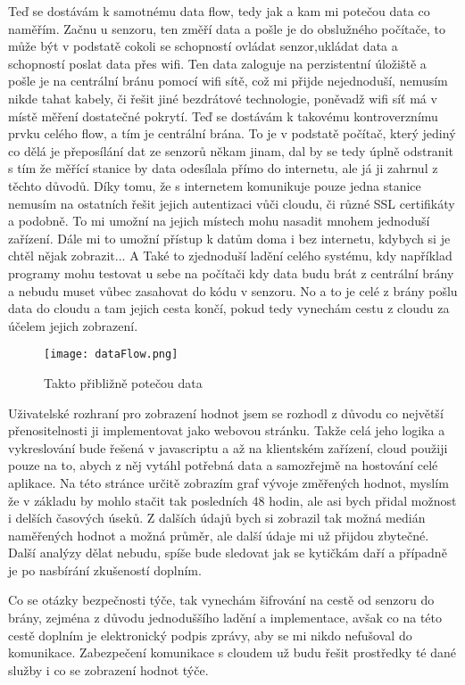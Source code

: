 Teď se dostávám k samotnému data flow, tedy jak a kam mi potečou data co naměřím. Začnu u senzoru, ten změří data 
a pošle je do obslužného počítače, to může být v podstatě cokoli se schopností ovládat senzor,ukládat data a schopností 
poslat data přes wifi. Ten data zaloguje na perzistentní úložiště a pošle je na centrální bránu pomocí wifi sítě, což mi 
přijde nejednoduší, nemusím nikde tahat kabely, či řešit jiné bezdrátové technologie, poněvadž wifi síť má v místě 
měření dostatečné pokrytí. Teď se dostávám k takovému kontroverznímu prvku celého flow, a tím je centrální brána. To je 
v podstatě počítač, který jediný co dělá je přeposílání dat ze senzorů někam jinam, dal by se tedy úplně odstranit s tím 
že měřící stanice by data odesílala přímo do internetu, ale já ji zahrnul z těchto důvodů. Díky tomu, že s internetem 
komunikuje pouze jedna stanice nemusím na ostatních řešit jejich autentizaci vůči cloudu, či různé SSL certifikáty 
a podobně. To mi umožní na jejich místech mohu nasadit mnohem jednoduší zařízení. Dále mi to umožní přístup k datům doma 
i bez internetu, kdybych si je chtěl nějak zobrazit... A Také to zjednoduší ladění celého systému, kdy například 
programy mohu testovat u sebe na počítači kdy data budu brát z centrální brány a nebudu muset vůbec zasahovat do kódu 
v senzoru. No a to je celé z brány pošlu data do cloudu a tam jejich cesta končí, pokud tedy vynechám cestu z cloudu za 
účelem jejich zobrazení.
\begin{figure}[h]
		\caption{Takto přibližně potečou data}
		\centering
		\texttt{[image: dataFlow.png]}
\end{figure}

Uživatelské rozhraní pro zobrazení hodnot jsem se rozhodl z důvodu co největší přenositelnosti ji implementovat jako 
webovou stránku. Takže celá jeho logika a vykreslování bude řešená v javascriptu a až na klientském zařízení, cloud 
použiji pouze na to, abych z něj vytáhl potřebná data a samozřejmě na hostování celé aplikace. Na této stránce určitě 
zobrazím graf vývoje změřených hodnot, myslím že v základu by mohlo stačit tak posledních 48 hodin, ale asi bych přidal 
možnost i delších časových úseků. Z dalších údajů bych si zobrazil tak možná medián naměřených hodnot a možná průměr, 
ale další údaje mi už přijdou zbytečné. Další analýzy dělat nebudu, spíše  bude sledovat jak se kytičkám daří a případně 
je po nasbírání zkušeností doplním.

Co se otázky bezpečnosti týče, tak vynechám šifrování na cestě od senzoru do brány, zejména z důvodu jednoduššího ladění 
a implementace, avšak co na této cestě doplním je elektronický podpis zprávy, aby se mi nikdo nefušoval do komunikace. 
Zabezpečení komunikace s cloudem už budu řešit prostředky té dané služby i co se zobrazení hodnot týče.
